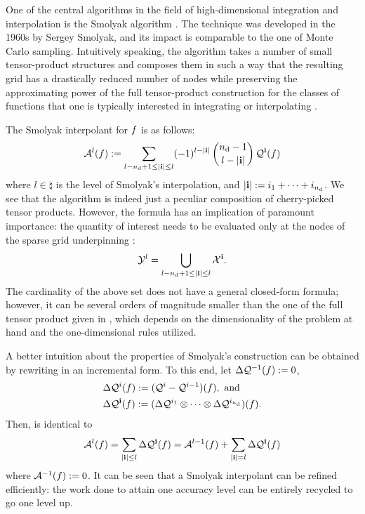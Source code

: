 One of the central algorithms in the field of high-dimensional integration and
interpolation is the Smolyak algorithm \cite{smolyak1963}. The technique was
developed in the 1960s by Sergey Smolyak, and its impact is comparable to the
one of Monte Carlo sampling. Intuitively speaking, the algorithm takes a number
of small tensor-product structures and composes them in such a way that the
resulting grid has a drastically reduced number of nodes while preserving the
approximating power of the full tensor-product construction for the classes of
functions that one is typically interested in integrating or interpolating
\cite{klimke2006}.

The Smolyak interpolant for $f$ is as follows:
\begin{equation} \elab{smolyak}
  \smolyak{l}(\f) := \sum_{l - \nin + 1 \leq |\vi| \leq l} (-1)^{l - |\vi|} \, {\nin - 1 \choose l - |\vi|} \, \tensor{\vi}(\f)
\end{equation}
where $l \in \natural$ is the level of Smolyak's interpolation, and $|\mathbf{i}| :=
i_1 + \dots + i_{n_\text{d}}$. We see that the algorithm is indeed just a peculiar
composition of cherry-picked tensor products. However, the formula has an
implication of paramount importance: the quantity of interest needs to be
evaluated only at the nodes of the sparse grid underpinning :
\begin{equation} \elab{smolyak-grid}
  \Y^l = \bigcup_{l - \nin + 1 \leq |\vi| \leq l} \X^\vi.
\end{equation}
The cardinality of the above set does not have a general closed-form formula;
however, it can be several orders of magnitude smaller than the one of the full
tensor product given in , which depends on the
dimensionality of the problem at hand and the one-dimensional rules utilized.

A better intuition about the properties of Smolyak's construction can be
obtained by rewriting  in an incremental form. To this end, let
$\Delta\mathcal{Q}^{-1}(f) := 0$,
\begin{align}
  & \Delta\tensor{i}(\f) := (\tensor{i} - \tensor{i - 1})(\f), \text{ and} \elab{tensor-delta-1d} \\
  & \Delta\tensor{\vi}(\f) := (\Delta\tensor{i_1} \otimes \cdots \otimes
  \Delta\tensor{i_\nin})(\f). \nonumber
\end{align}
Then,  is identical to
\begin{equation} \elab{smolyak-incremental}
  \smolyak{l}(\f) = \sum_{|\vi| \leq l} \Delta\tensor{\vi}(\f) = \smolyak{l - 1}(\f) + \sum_{|\vi| = l} \Delta\tensor{\vi}(\f)
\end{equation}
where $\mathcal{A}^{-1}(f) := 0$. It can be seen that a Smolyak interpolant can be
refined efficiently: the work done to attain one accuracy level can be entirely
recycled to go one level up.

